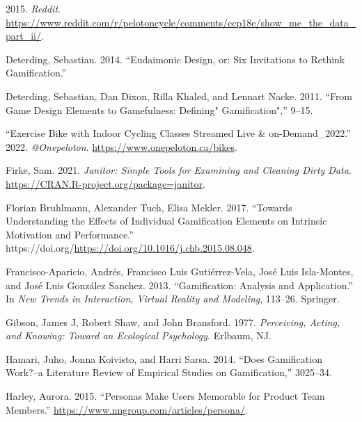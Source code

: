 \documentclass[
]{article}
\newlength{\cslhangindent}
\newlength{\cslentryspacingunit} %
\newenvironment{CSLReferences}[2] %
 {%
  \setlength{\parindent}{0pt}
  \ifodd #1
  \let\oldpar\par
  \def\par{\hangindent=\cslhangindent\oldpar}
  \fi
  \setlength{\parskip}{#2\cslentryspacingunit}
 }%
 {}
\begin{document}
\hypertarget{refs}{}
\begin{CSLReferences}{1}{0}
\leavevmode{}%
2015. \emph{Reddit}. \url{https://www.reddit.com/r/pelotoncycle/comments/ccp18e/show_me_the_data_part_ii/}.

\leavevmode{}%
Deterding, Sebastian. 2014. {``Eudaimonic Design, or: Six Invitations to Rethink Gamification.''}

\leavevmode{}%
Deterding, Sebastian, Dan Dixon, Rilla Khaled, and Lennart Nacke. 2011. {``From Game Design Elements to Gamefulness: Defining" Gamification",''} 9--15.

\leavevmode{}%
{``Exercise Bike with Indoor Cycling Classes Streamed Live \& on-Demand\_2022.''} 2022. \emph{@Onepeloton}. \url{https://www.onepeloton.ca/bikes}.

\leavevmode{}%
Firke, Sam. 2021. \emph{Janitor: Simple Tools for Examining and Cleaning Dirty Data}. \url{https://CRAN.R-project.org/package=janitor}.

\leavevmode{}%
Florian Bruhlmann, Alexander Tuch, Elisa Mekler. 2017. {``Towards Understanding the Effects of Individual Gamification Elements on Intrinsic Motivation and Performance.''} https://doi.org/\url{https://doi.org/10.1016/j.chb.2015.08.048}.

\leavevmode{}%
Francisco-Aparicio, Andrés, Francisco Luis Gutiérrez-Vela, José Luis Isla-Montes, and José Luis González Sanchez. 2013. {``Gamification: Analysis and Application.''} In \emph{New Trends in Interaction, Virtual Reality and Modeling}, 113--26. Springer.

\leavevmode{}%
Gibson, James J, Robert Shaw, and John Bransford. 1977. \emph{Perceiving, Acting, and Knowing: Toward an Ecological Psychology}. Erlbaum, NJ.

\leavevmode{}%
Hamari, Juho, Jonna Koivisto, and Harri Sarsa. 2014. {``Does Gamification Work?--a Literature Review of Empirical Studies on Gamification,''} 3025--34.

\leavevmode{}%
Harley, Aurora. 2015. {``Personas Make Users Memorable for Product Team Members.''} \url{https://www.nngroup.com/articles/persona/}.


\end{CSLReferences}
\end{document}
